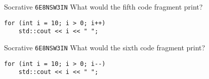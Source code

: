 \begin{frame}[fragile]{Socrative \texttt{6E8NSW3IN}}
    What would the fifth code fragment print?
	\begin{lstlisting}
for (int i = 10; i > 0; i++)
    std::cout << i << " ";
	\end{lstlisting}
\end{frame}

\begin{frame}[fragile]{Socrative \texttt{6E8NSW3IN}}
    What would the sixth code fragment print?
	\begin{lstlisting}
for (int i = 10; i > 0; i--)
    std::cout << i << " ";
	\end{lstlisting}
\end{frame}

